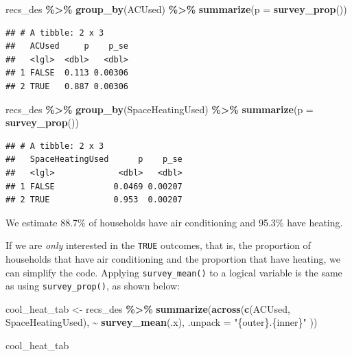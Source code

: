 \documentclass[
]{krantz}
\makeatletter
\newenvironment{Shaded}{\begin{snugshade}}{\end{snugshade}}
\newcommand{\AttributeTok}[1]{\textcolor[rgb]{0.27,0.27,0.27}{#1}}
\newcommand{\FunctionTok}[1]{\textcolor[rgb]{0.27,0.27,0.27}{\textbf{#1}}}
\newcommand{\NormalTok}[1]{#1}
\newcommand{\OtherTok}[1]{\textcolor[rgb]{0.37,0.37,0.37}{#1}}
\newcommand{\SpecialCharTok}[1]{\textcolor[rgb]{0.43,0.43,0.43}{\textbf{#1}}}
\newcommand{\StringTok}[1]{\textcolor[rgb]{0.5,0.5,0.5}{#1}}
\newenvironment{kframe}{%
\medskip{}
\setlength{\fboxsep}{.8em}
 \def\at@end@of@kframe{}%
 \ifinner\ifhmode%
  \def\at@end@of@kframe{\end{minipage}}%
  \begin{minipage}{\columnwidth}%
 \fi\fi%
 \def\FrameCommand##1{\hskip\@totalleftmargin \hskip-\fboxsep
 \colorbox{shadecolor}{##1}\hskip-\fboxsep
     \hskip-\linewidth \hskip-\@totalleftmargin \hskip\columnwidth}%
 \MakeFramed {\advance\hsize-\width
   \@totalleftmargin\z@ \linewidth\hsize
   \@setminipage}}%
 {\par\unskip\endMakeFramed%
 \at@end@of@kframe}
\renewenvironment{Shaded}{\begin{kframe}}{\end{kframe}}
\makeatother
\begin{document}
\begin{Shaded}
\begin{Highlighting}[]
\NormalTok{recs\_des }\SpecialCharTok{\%\textgreater{}\%}
  \FunctionTok{group\_by}\NormalTok{(ACUsed) }\SpecialCharTok{\%\textgreater{}\%}
  \FunctionTok{summarize}\NormalTok{(}\AttributeTok{p =} \FunctionTok{survey\_prop}\NormalTok{())}
\end{Highlighting}
\end{Shaded}

\begin{verbatim}
## # A tibble: 2 x 3
##   ACUsed     p    p_se
##   <lgl>  <dbl>   <dbl>
## 1 FALSE  0.113 0.00306
## 2 TRUE   0.887 0.00306
\end{verbatim}

\begin{Shaded}
\begin{Highlighting}[]
\NormalTok{recs\_des }\SpecialCharTok{\%\textgreater{}\%}
  \FunctionTok{group\_by}\NormalTok{(SpaceHeatingUsed) }\SpecialCharTok{\%\textgreater{}\%}
  \FunctionTok{summarize}\NormalTok{(}\AttributeTok{p =} \FunctionTok{survey\_prop}\NormalTok{())}
\end{Highlighting}
\end{Shaded}

\begin{verbatim}
## # A tibble: 2 x 3
##   SpaceHeatingUsed      p    p_se
##   <lgl>             <dbl>   <dbl>
## 1 FALSE            0.0469 0.00207
## 2 TRUE             0.953  0.00207
\end{verbatim}

We estimate 88.7\% of households have air conditioning and 95.3\% have heating.

If we are \emph{only} interested in the \texttt{TRUE} outcomes, that is, the proportion of households that have air conditioning and the proportion that have heating, we can simplify the code. Applying \texttt{survey\_mean()} to a logical variable is the same as using \texttt{survey\_prop()}, as shown below:

\begin{Shaded}
\begin{Highlighting}[]
\NormalTok{cool\_heat\_tab }\OtherTok{\textless{}{-}}\NormalTok{ recs\_des }\SpecialCharTok{\%\textgreater{}\%}
  \FunctionTok{summarize}\NormalTok{(}\FunctionTok{across}\NormalTok{(}\FunctionTok{c}\NormalTok{(ACUsed, SpaceHeatingUsed), }\SpecialCharTok{\textasciitilde{}} \FunctionTok{survey\_mean}\NormalTok{(.x),}
    \AttributeTok{.unpack =} \StringTok{"\{outer\}.\{inner\}"}
\NormalTok{  ))}

\NormalTok{cool\_heat\_tab}
\end{Highlighting}
\end{Shaded}
\end{document}
